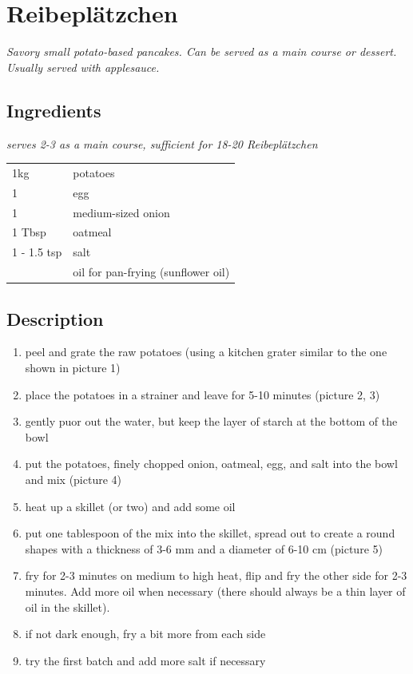 \section{Reibeplätzchen}
\textit{Savory small potato-based pancakes. Can be served as a main course or dessert. Usually served with applesauce.}


\subsection*{Ingredients}
\textit{serves 2-3 as a main course, sufficient for 18-20  Reibeplätzchen}

\begin{tabular}{ l l }
  1kg & potatoes \\
  1 & egg \\
  1 & medium-sized onion \\
  1 Tbsp & oatmeal \\
  1 - 1.5 tsp & salt \\
    & oil for pan-frying (sunflower oil) \\
\end{tabular}

\subsection*{Description}
\begin{enumerate}
	\item peel and grate the raw potatoes (using a kitchen grater similar to the one shown in picture 1)
	\item place the potatoes in a strainer and leave for 5-10 minutes (picture 2, 3)
	\item gently puor out the water, but keep the layer of starch at the bottom of the bowl
	\item put the potatoes, finely chopped onion, oatmeal, egg, and salt into the bowl and mix (picture 4)
	\item heat up a skillet (or two) and add some oil
	\item put one tablespoon of the mix into the skillet, spread out to create a round shapes with a thickness of 3-6 mm and a diameter of 6-10 cm (picture 5)
	\item fry for 2-3  minutes on medium to high heat, flip and fry the other side for 2-3 minutes. Add more oil when necessary (there should always be a thin layer of oil in the skillet).
	\item if not dark enough, fry a bit more from each side
	\item try the first batch and add more salt if necessary
\end{enumerate}



